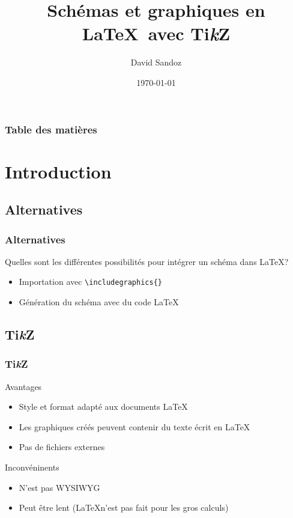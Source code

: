 \documentclass{clic_latex_beamer}
\newcommand{\TikZ}{Ti\textit{k}Z }
\begin{document}
\title{Schémas et graphiques en \LaTeX\ avec \TikZ}
\author{David Sandoz}
\date{\today}
\titlegraphic{\ccbysa}

\frame{\titlepage}


\begin{frame}
\frametitle{Table des matières}
\tableofcontents[]
\end{frame}


\section{Introduction}
\subsection{Alternatives}
\begin{frame}
\frametitle{Alternatives}
Quelles sont les différentes possibilités pour intégrer un schéma dans \LaTeX ?
\begin{itemize}
\item Importation avec \texttt{\textbackslash includegraphics\{\}}
\item Génération du schéma avec du code \LaTeX
\end{itemize}
\end{frame}
 
\subsection{Ti\protect\textit{k}Z}
\begin{frame}[fragile]
\frametitle{\TikZ}
Avantages
\begin{itemize}
\item Style et format adapté aux documents \LaTeX
\item Les graphiques créés peuvent contenir du texte écrit en \LaTeX
\item Pas de fichiers externes
\end{itemize}
Inconvéninents
\begin{itemize}
\item N'est pas WYSIWYG
\item Peut être lent (\LaTeX n'est pas fait pour les gros calculs)
\end{itemize}
\end{frame}
 
\end{document}
